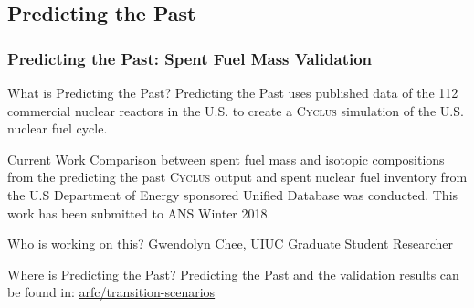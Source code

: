 \newcommand{\Cyclus}{\textsc{Cyclus}\xspace}%
\subsection{Predicting the Past}
\begin{frame}
  \frametitle{Predicting the Past: Spent Fuel Mass Validation}

\begin{block}{What is Predicting the Past? }
Predicting the Past uses published data of the 112 commercial nuclear reactors in the U.S. to create a \Cyclus simulation of the U.S. nuclear fuel cycle.
\end{block}

\begin{block}{Current Work}
Comparison between spent fuel mass and isotopic compositions from the predicting the past \Cyclus output and spent nuclear fuel inventory from the U.S Department of Energy sponsored Unified Database\cite{peterson_unf-st&dards_2017} was conducted. This work has been submitted to ANS Winter 2018.
\end{block}

\begin{block}{Who is working on this?}
Gwendolyn Chee, UIUC Graduate Student Researcher
\end{block}

\begin{block}{Where is Predicting the Past?}
Predicting the Past and the validation results can be found in: \href{https://github.com/arfc/transition-scenarios/tree/master/input/predicting-the-past}{arfc/transition-scenarios} 
\end{block}

\end{frame}
